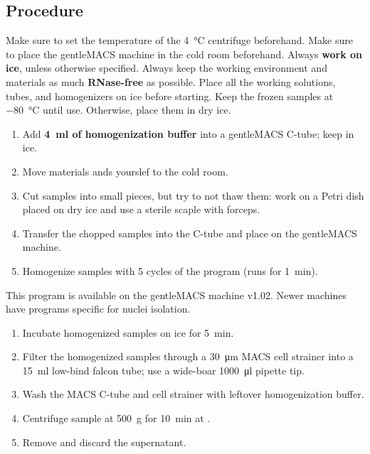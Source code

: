 \documentclass[10pt]{report}
\begin{document}
\subsection*{Procedure}

\alert{Make sure to set the temperature of the \qty{4}{\degreeCelsius} centrifuge beforehand.}
\alert{Make sure to place the gentleMACS\textregistered{} machine in the cold room beforehand.}
\alert{Always \textbf{work on ice}, unless otherwise specified.}
\alert{Always keep the working environment and materials as much \textbf{RNase-free} as possible.}
\alert{Place all the working solutions, tubes, and homogenizers on ice before starting.}
\alert{Keep the frozen samples at \qty{-80}{\degreeCelsius} until use. Otherwise, place them in dry ice.}

\begin{enumerate}[series = steps]
	\item Add \textbf{\qty{4}{\ml} of homogenization buffer} into a gentleMACS\textregistered{} C-tube; keep in ice.
	\item Move materials ands yourslef to the cold room.
	\item Cut samples into small pieces, but try to not thaw them: work on a Petri dish placed on dry ice and use a sterile scaple with forceps.
	\item Transfer the chopped samples into the C-tube and place on the gentleMACS\textregistered{} machine.
	\item Homogenize samples with 5 cycles of the program  (runs for \qty{1}{\minute}).
\end{enumerate}

\bigskip\alert{This program is available on the gentleMACS\textregistered{} machine v1.02. Newer machines have programs specific for nuclei isolation.}
	
\begin{enumerate}[resume = steps]
	\item Incubate homogenized samples on ice for \qty{5}{\minute}.
	\item Filter the homogenized samples through a \qty{30}{\um} MACS\textregistered{} cell strainer into a \qty{15}{\ml} low-bind falcon tube; use a wide-boar \qty[scientific-notation = false, group-digits = false]{1000}{\ul} pipette tip.
	\item Wash the MACS\textregistered{} C-tube and cell strainer with leftover homogenization buffer.
	\item Centrifuge sample at \qty{500}{\g} for \qty{10}{\minute} at \fourdegree.
	\item Remove and discard the supernatant.
\end{enumerate}
\end{document}
